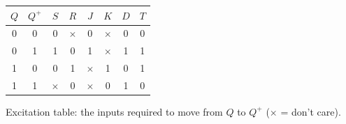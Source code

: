 \begin{center}
\renewcommand{\arraystretch}{1.25}
\begin{tabular}{cc|cc|cc|c|c}
\toprule
$Q$ & $Q^{+}$ & $S$ & $R$ & $J$ & $K$ & $D$ & $T$ \\
\midrule
0 & 0 & 0 & $\times$ & 0 & $\times$ & 0 & 0 \\
0 & 1 & 1 & 0 & 1 & $\times$ & 1 & 1 \\
1 & 0 & 0 & 1 & $\times$ & 1 & 0 & 1 \\
1 & 1 & $\times$ & 0 & $\times$ & 0 & 1 & 0 \\
\bottomrule
\end{tabular}

\smallskip
{\small Excitation table: the inputs required to move from $Q$ to $Q^{+}$ ($\times$ = don't care).}
\end{center}
